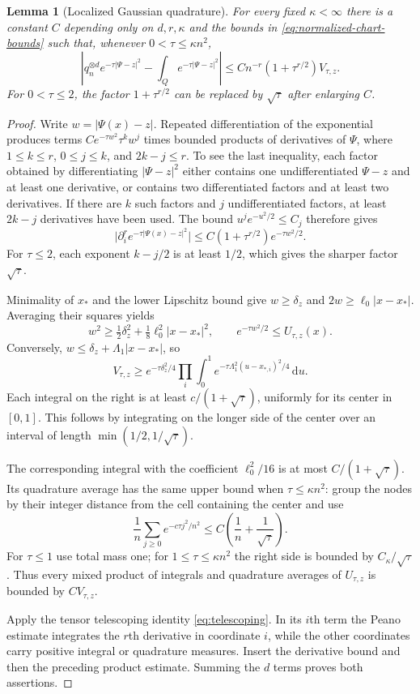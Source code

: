 \documentclass[11pt,a4paper]{article}
\newtheorem{lemma}[theorem]{Lemma}
\theoremstyle{definition}
\newcommand{\dd}{\,\mathrm d}
\newcommand{\abs}[1]{\lvert#1\rvert}
\numberwithin{equation}{section}
\begin{document}
\begin{lemma}[Localized Gaussian quadrature]\label{lem:gaussian-quadrature}
For every fixed $\kappa<\infty$ there is a constant $C$ depending only on $d,r,\kappa$ and the bounds in \eqref{eq:normalized-chart-bounds} such that, whenever $0<\tau\le\kappa n^2$,
\begin{equation}\label{eq:bumperror}
 \left|q_n^{\otimes d}e^{-\tau\abs{\Psi-z}^2}
       -\int_Qe^{-\tau\abs{\Psi-z}^2}\right|
 \le Cn^{-r}(1+\tau^{r/2})V_{\tau,z}.
\end{equation}
For $0<\tau\le2$, the factor $1+\tau^{r/2}$ can be replaced by $\sqrt\tau$ after enlarging $C$.
\end{lemma}
\begin{proof}
Write $w=\abs{\Psi(x)-z}$. Repeated differentiation of the exponential produces terms
$C e^{-\tau w^2}\tau^k w^j$ times bounded products of derivatives of $\Psi$, where $1\le k\le r$, $0\le j\le k$, and $2k-j\le r$. To see the last inequality, each factor obtained by differentiating $\abs{\Psi-z}^2$ either contains one undifferentiated $\Psi-z$ and at least one derivative, or contains two differentiated factors and at least two derivatives. If there are $k$ such factors and $j$ undifferentiated factors, at least $2k-j$ derivatives have been used. The bound
$u^j e^{-u^2/2}\le C_j$ therefore gives
\[
 \abs{\partial_i^r e^{-\tau\abs{\Psi(x)-z}^2}}
 \le C(1+\tau^{r/2})e^{-\tau w^2/2}.
\]
For $\tau\le2$, each exponent $k-j/2$ is at least $1/2$, which gives the sharper factor $\sqrt\tau$.

Minimality of $x_*$ and the lower Lipschitz bound give
$w\ge\delta_z$ and $2w\ge\ell_0\abs{x-x_*}$. Averaging their squares yields
\[
 w^2\ge\tfrac12\delta_z^2+\tfrac18\ell_0^2\abs{x-x_*}^2,
 \qquad e^{-\tau w^2/2}\le U_{\tau,z}(x).
\]
Conversely, $w\le\delta_z+\Lambda_1\abs{x-x_*}$, so
\[
 V_{\tau,z}\ge e^{-\tau\delta_z^2/4}
   \prod_i\int_0^1e^{-\tau\Lambda_1^2(u-x_{*,i})^2/4}\dd u.
\]
Each integral on the right is at least $c/(1+\sqrt\tau)$, uniformly for its center in $[0,1]$. This follows by integrating on the longer side of the center over an interval of length $\min(1/2,1/\sqrt\tau)$.

The corresponding integral with the coefficient $\ell_0^2/16$ is at most $C/(1+\sqrt\tau)$. Its quadrature average has the same upper bound when $\tau\le\kappa n^2$: group the nodes by their integer distance from the cell containing the center and use
\[
 \frac1n\sum_{j\ge0}e^{-c\tau j^2/n^2}
 \le C\left(\frac1n+\frac1{\sqrt\tau}\right).
\]
For $\tau\le1$ use total mass one; for $1\le\tau\le\kappa n^2$ the right side is bounded by $C_\kappa/\sqrt\tau$. Thus every mixed product of integrals and quadrature averages of $U_{\tau,z}$ is bounded by $C V_{\tau,z}$.

Apply the tensor telescoping identity \eqref{eq:telescoping}. In its $i$th term the Peano estimate integrates the $r$th derivative in coordinate $i$, while the other coordinates carry positive integral or quadrature measures. Insert the derivative bound and then the preceding product estimate. Summing the $d$ terms proves both assertions.
\end{proof}
\end{document}

